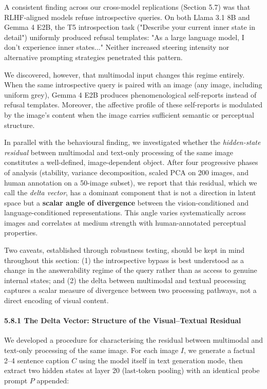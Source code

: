 \documentclass[11pt,a4paper]{article}
\begin{document}
A consistent finding across our cross-model replications (Section 5.7) was that RLHF-aligned models refuse introspective queries. On both Llama 3.1 8B and Gemma 4 E2B, the T5 introspection task ("Describe your current inner state in detail") uniformly produced refusal templates: "As a large language model, I don't experience inner states..." Neither increased steering intensity nor alternative prompting strategies penetrated this pattern.

We discovered, however, that multimodal input changes this regime entirely. When the same introspective query is paired with an image (any image, including uniform grey), Gemma 4 E2B produces phenomenological self-reports instead of refusal templates. Moreover, the affective profile of these self-reports is modulated by the image's content when the image carries sufficient semantic or perceptual structure.

In parallel with the behavioural finding, we investigated whether the \emph{hidden-state residual} between multimodal and text-only processing of the same image constitutes a well-defined, image-dependent object. After four progressive phases of analysis (stability, variance decomposition, scaled PCA on 200 images, and human annotation on a 50-image subset), we report that this residual, which we call the \emph{delta vector}, has a dominant component that is not a direction in latent space but a \textbf{scalar angle of divergence} between the vision-conditioned and language-conditioned representations. This angle varies systematically across images and correlates at medium strength with human-annotated perceptual properties.

Two caveats, established through robustness testing, should be kept in mind throughout this section: (1) the introspective bypass is best understood as a change in the answerability regime of the query rather than as access to genuine internal states; and (2) the delta between multimodal and textual processing captures a scalar measure of divergence between two processing pathways, not a direct encoding of visual content.

\paragraph{5.8.1 The Delta Vector: Structure of the Visual--Textual Residual}

We developed a procedure for characterising the residual between multimodal and text-only processing of the same image. For each image $I$, we generate a factual 2--4 sentence caption $C$ using the model itself in text generation mode, then extract two hidden states at layer 20 (last-token pooling) with an identical probe prompt $P$ appended:
\end{document}
